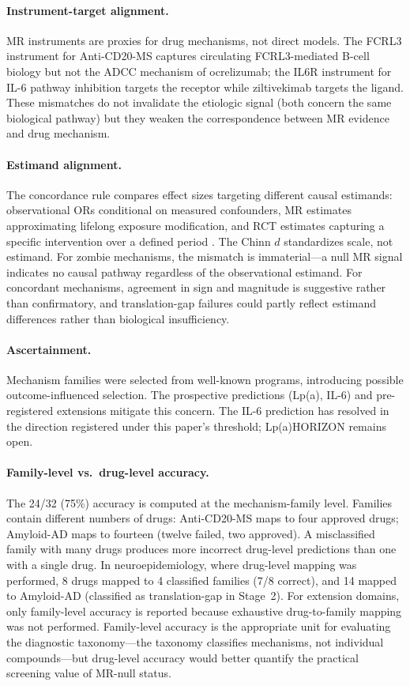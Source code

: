 \documentclass[11pt]{article}
\begin{document}
\paragraph{Instrument-target alignment.} MR instruments are proxies for drug mechanisms, not direct models. The FCRL3 instrument for Anti-CD20-MS captures circulating FCRL3-mediated B-cell biology but not the ADCC mechanism of ocrelizumab; the IL6R instrument for IL-6 pathway inhibition targets the receptor while ziltivekimab targets the ligand. These mismatches do not invalidate the etiologic signal (both concern the same biological pathway) but they weaken the correspondence between MR evidence and drug mechanism.

\paragraph{Estimand alignment.} The concordance rule compares effect sizes targeting different causal estimands: observational ORs conditional on measured confounders, MR estimates approximating lifelong exposure modification, and RCT estimates capturing a specific intervention over a defined period \cite{hernan2016}. The Chinn $d$ standardizes scale, not estimand. For zombie mechanisms, the mismatch is immaterial---a null MR signal indicates no causal pathway regardless of the observational estimand. For concordant mechanisms, agreement in sign and magnitude is suggestive rather than confirmatory, and translation-gap failures could partly reflect estimand differences rather than biological insufficiency.

\paragraph{Ascertainment.} Mechanism families were selected from well-known programs, introducing possible outcome-influenced selection. The prospective predictions (Lp(a), IL-6) and pre-registered extensions mitigate this concern. The IL-6 prediction has resolved in the direction registered under this paper's threshold; Lp(a)HORIZON remains open.

\paragraph{Family-level vs.\ drug-level accuracy.} The 24/32 (75\%) accuracy is computed at the mechanism-family level. Families contain different numbers of drugs: Anti-CD20-MS maps to four approved drugs; Amyloid-AD maps to fourteen (twelve failed, two approved). A misclassified family with many drugs produces more incorrect drug-level predictions than one with a single drug. In neuroepidemiology, where drug-level mapping was performed, 8 drugs mapped to 4 classified families (7/8 correct), and 14 mapped to Amyloid-AD (classified as translation-gap in Stage~2). For extension domains, only family-level accuracy is reported because exhaustive drug-to-family mapping was not performed. Family-level accuracy is the appropriate unit for evaluating the diagnostic taxonomy---the taxonomy classifies mechanisms, not individual compounds---but drug-level accuracy would better quantify the practical screening value of MR-null status.
\end{document}
